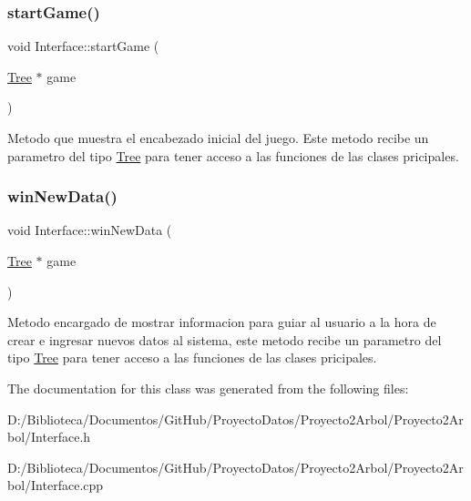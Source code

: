 \subsubsection{\texorpdfstring{start\+Game()}{startGame()}}
{\footnotesize\ttfamily void Interface\+::start\+Game (\begin{DoxyParamCaption}\item[{\mbox{\hyperlink{class_tree}{Tree}} $\ast$}]{game }\end{DoxyParamCaption})\hspace{0.3cm}{\ttfamily [static]}}

Metodo que muestra el encabezado inicial del juego. Este metodo recibe un parametro del tipo \mbox{\hyperlink{class_tree}{Tree}} para tener acceso a las funciones de las clases pricipales. \mbox{\label{class_interface_acdee7e4ed00d8fa01a8f5f397a7d5f75}} 
\subsubsection{\texorpdfstring{win\+New\+Data()}{winNewData()}}
{\footnotesize\ttfamily void Interface\+::win\+New\+Data (\begin{DoxyParamCaption}\item[{\mbox{\hyperlink{class_tree}{Tree}} $\ast$}]{game }\end{DoxyParamCaption})\hspace{0.3cm}{\ttfamily [static]}}

Metodo encargado de mostrar informacion para guiar al usuario a la hora de crear e ingresar nuevos datos al sistema, este metodo recibe un parametro del tipo \mbox{\hyperlink{class_tree}{Tree}} para tener acceso a las funciones de las clases pricipales. 

The documentation for this class was generated from the following files\+:\begin{DoxyCompactItemize}
\item 
D\+:/\+Biblioteca/\+Documentos/\+Git\+Hub/\+Proyecto\+Datos/\+Proyecto2\+Arbol/\+Proyecto2\+Arbol/Interface.\+h\item 
D\+:/\+Biblioteca/\+Documentos/\+Git\+Hub/\+Proyecto\+Datos/\+Proyecto2\+Arbol/\+Proyecto2\+Arbol/Interface.\+cpp\end{DoxyCompactItemize}
